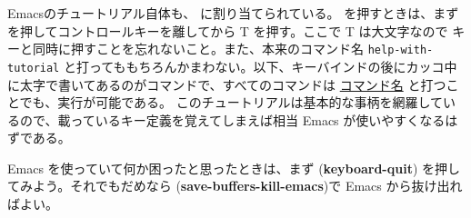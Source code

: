 Emacsのチュートリアル自体も、
  に割り当てられている。  を押すときは、まずを押してコントロールキーを離してから T を押す。ここで T は大文字なので  キーと同時に押すことを忘れないこと。また、本来のコマンド名  {\tt help-with-tutorial} と打ってももちろんかまわない。以下、キーバインドの後にカッコ中に太字で書いてあるのがコマンドで、すべてのコマンドは  \underline{コマンド名} と打つことでも、実行が可能である。
このチュートリアルは基本的な事柄を網羅しているので、載っているキー定義を覚えてしまえば相当 Emacs が使いやすくなるはずである。

Emacs を使っていて何か困ったと思ったときは、まず  ({\bf keyboard-quit})
を押してみよう。それでもだめなら   ({\bf save-buffers-kill-emacs})で Emacs から抜け出ればよい。

